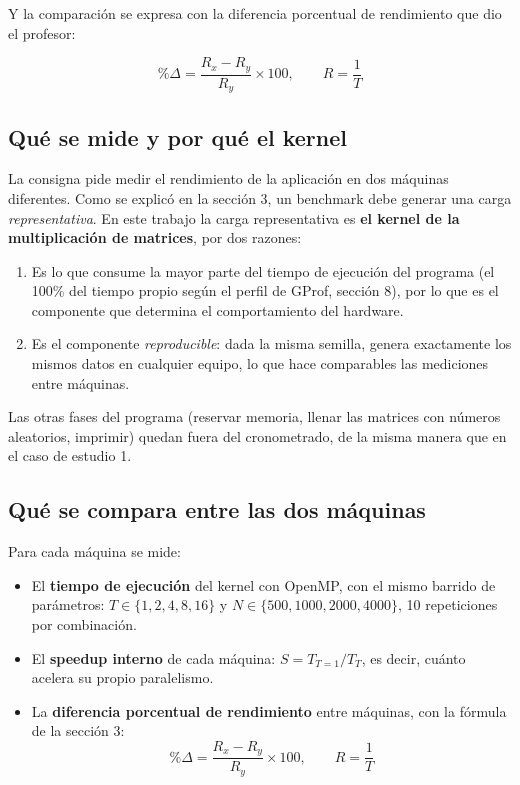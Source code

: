 Y la comparación se expresa con la diferencia porcentual de rendimiento que dio el profesor:

\[
\%\Delta = \frac{R_x - R_y}{R_y} \times 100, \qquad R = \frac{1}{T}
\]

\subsection{Qué se mide y por qué el kernel}

La consigna pide medir el rendimiento de la aplicación en dos máquinas diferentes. Como se explicó en la sección 3, un benchmark debe generar una carga \emph{representativa}. En este trabajo la carga representativa es \textbf{el kernel de la multiplicación de matrices}, por dos razones:

\begin{enumerate}
    \item Es lo que consume la mayor parte del tiempo de ejecución del programa (el 100\% del tiempo propio según el perfil de GProf, sección 8), por lo que es el componente que determina el comportamiento del hardware.
    \item Es el componente \emph{reproducible}: dada la misma semilla, genera exactamente los mismos datos en cualquier equipo, lo que hace comparables las mediciones entre máquinas.
\end{enumerate}

Las otras fases del programa (reservar memoria, llenar las matrices con números aleatorios, imprimir) quedan fuera del cronometrado, de la misma manera que en el caso de estudio 1.

\subsection{Qué se compara entre las dos máquinas}

Para cada máquina se mide:

\begin{itemize}
    \item El \textbf{tiempo de ejecución} del kernel con OpenMP, con el mismo barrido de parámetros: $T \in \{1, 2, 4, 8, 16\}$ y $N \in \{500, 1000, 2000, 4000\}$, 10 repeticiones por combinación.
    \item El \textbf{speedup interno} de cada máquina: $S = T_{T=1} / T_{T}$, es decir, cuánto acelera su propio paralelismo.
    \item La \textbf{diferencia porcentual de rendimiento} entre máquinas, con la fórmula de la sección 3:
    \begin{equation}
    \%\Delta = \frac{R_x - R_y}{R_y} \times 100, \qquad R = \frac{1}{T}
    \end{equation}
\end{itemize}

